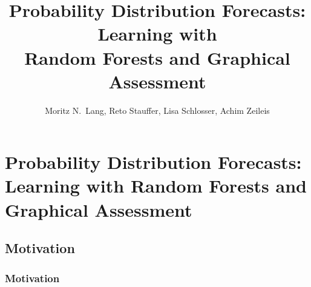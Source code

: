 \documentclass[11pt,t,usepdftitle=false,aspectratio=169]{beamer}
\title[Probability Distribution Forecasts]{Probability Distribution Forecasts: Learning with
  \\\vspace{.2em} Random Forests and Graphical Assessment}
\author[Moritz N. Lang]{Moritz N.\ Lang, Reto Stauffer, Lisa Schlosser, Achim Zeileis}
\begin{document}
\section{Probability Distribution Forecasts: Learning with Random Forests and Graphical Assessment}

\subsection{Motivation}

\begin{frame}%
\frametitle{Motivation}
\vspace{-0.41cm}
\begin{figure}[!htb]
\begin{center}
\end{center}
\endminipage
{}
\begin{center}
\end{center}
\end{figure}
\end{frame}
\end{document}
